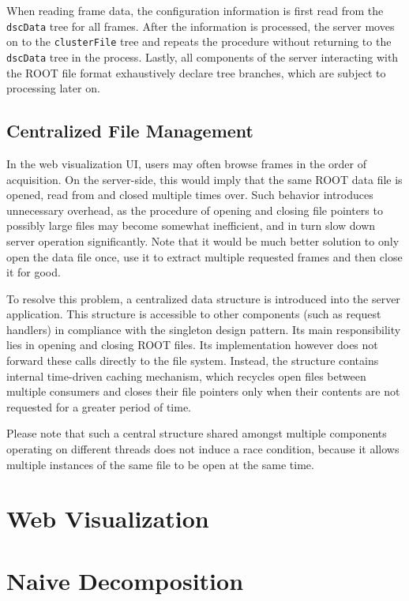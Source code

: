 When reading frame data, the configuration information is first read from the \texttt{dscData} tree for all frames. After the information is processed, the server moves on to the \texttt{clusterFile} tree and repeats the procedure without returning to the \texttt{dscData} tree in the process. Lastly, all components of the server interacting with the ROOT file format exhaustively declare tree branches, which are subject to processing later on.

\subsection{Centralized File Management}
In the web visualization UI, users may often browse frames in the order of acquisition. On the server-side, this would imply that the same ROOT data file is opened, read from and closed multiple times over. Such behavior introduces unnecessary overhead, as the procedure of opening and closing file pointers to possibly large files may become somewhat inefficient, and in turn slow down server operation significantly. Note that it would be much better solution to only open the data file once, use it to extract multiple requested frames and then close it for good.

To resolve this problem, a centralized data structure is introduced into the server application. This structure is accessible to other components (such as request handlers) in compliance with the singleton design pattern. Its main responsibility lies in opening and closing ROOT files. Its implementation however does not forward these calls directly to the file system. Instead, the structure contains internal time-driven caching mechanism, which recycles open files between multiple consumers and closes their file pointers only when their contents are not requested for a greater period of time.

Please note that such a central structure shared amongst multiple components operating on different threads does not induce a race condition, because it allows multiple instances of the same file to be open at the same time.

\section{Web Visualization}
\label{chapter:web-visualization}

\section{Naive Decomposition}

